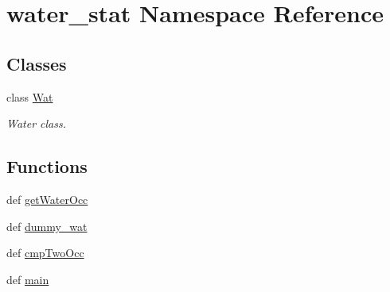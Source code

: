 \hypertarget{namespacewater__stat}{\section{water\-\_\-stat Namespace Reference}
\label{namespacewater__stat}
}
\subsection*{Classes}
\begin{DoxyCompactItemize}
\item 
class \hyperlink{classwater__stat_1_1_wat}{Wat}
\begin{DoxyCompactList}\small\item\em Water class. \end{DoxyCompactList}\end{DoxyCompactItemize}
\subsection*{Functions}
\begin{DoxyCompactItemize}
\item 
def \hyperlink{namespacewater__stat_a3d552b3a68733d4252c348878708688a}{get\-Water\-Occ}
\item 
def \hyperlink{namespacewater__stat_ae1edc35f769774e0325e04d47160a33b}{dummy\-\_\-wat}
\item 
def \hyperlink{namespacewater__stat_a95964db846c23da83d94339befc4c324}{cmp\-Two\-Occ}
\item 
def \hyperlink{namespacewater__stat_af6636ad532a4064ba60eec675245dffb}{main}
\end{DoxyCompactItemize}



